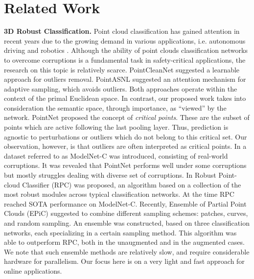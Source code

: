 \documentclass[10pt,twocolumn,letterpaper]{article}
\begin{document}
\section{Related Work}
\textbf{3D Robust Classification.}
Point cloud classification has gained attention in recent years \cite{dgcnn, curvenet, cloud_walker, pointnet, pointnet++, point_mlp, pointbert, gdanet, paconv, pct} due to the growing demand in various applications, i.e. autonomous driving \cite{autonomous_driving1, autonomous_driving2} and robotics \cite{robotics}. Although the ability of point clouds classification networks to overcome corruptions is a fundamental task in safety-critical applications, the research on this topic is relatively scarce.
PointCleanNet \cite{pointcleannet} suggested a learnable approach for outliers removal. PointASNL \cite{point_asnl} suggested an attention mechanism for adaptive sampling, which avoids outliers. Both approaches operate within the context of the primal Euclidean space. In contrast, our proposed work takes into consideration the semantic space, through importance, as ``viewed'' by the network. PointNet \cite{pointnet} proposed the concept of \emph{critical points}. These are the subset of points which are active following the last pooling layer. Thus,  prediction is agnostic to perturbations or outliers which do not belong to this critical set. Our observation, however, is that outliers are often interpreted as critical points.
In \cite{modelnet_c} a dataset referred to as ModelNet-C was introduced, consisting of real-world corruptions. It was revealed that PointNet performs well under some corruptions but mostly struggles dealing with diverse set of corruptions. In \cite{modelnet_c} Robust Point-cloud Classifier (RPC) was proposed, an algorithm based on a collection of the most robust modules across typical classification networks. At the time RPC reached SOTA performance on ModelNet-C. Recently, Ensemble of Partial Point Clouds (EPiC) \cite{epic} suggested to combine different sampling schemes: patches, curves, and random sampling. An ensemble was constructed, based on three classification networks, each specializing in a certain sampling method.
This algorithm was able to outperform RPC, both in the unaugmented and in the augmented cases. 
We note that such ensemble methods are relatively slow, and require considerable hardware for parallelism. Our focus here is on a very light and fast approach for online applications.
\end{document}
